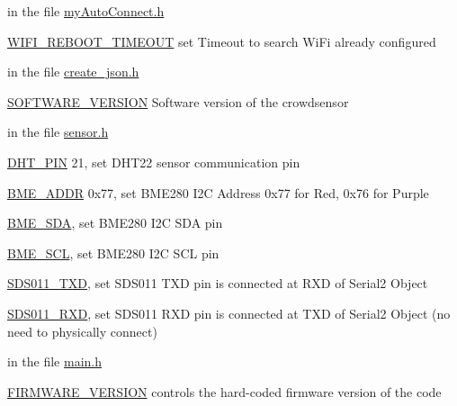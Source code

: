 \begin{DoxyItemize}
\item in the file \mbox{\hyperlink{my_auto_connect_8h}{my\+Auto\+Connect.\+h}}
\begin{DoxyItemize}
\item \mbox{\hyperlink{my_auto_connect_8h_ab8e5b92436ed19ff04454974ca9b5140}{W\+I\+F\+I\+\_\+\+R\+E\+B\+O\+O\+T\+\_\+\+T\+I\+M\+E\+O\+UT}} set Timeout to search Wi\+Fi already configured
\end{DoxyItemize}
\item in the file \mbox{\hyperlink{create__json_8h}{create\+\_\+json.\+h}}
\begin{DoxyItemize}
\item \mbox{\hyperlink{create__json_8h_ab1d2a71062488a1b8d2f9129682a42b9}{S\+O\+F\+T\+W\+A\+R\+E\+\_\+\+V\+E\+R\+S\+I\+ON}} Software version of the crowdsensor
\end{DoxyItemize}
\item in the file \mbox{\hyperlink{sensor_8h}{sensor.\+h}}
\begin{DoxyItemize}
\item \mbox{\hyperlink{sensor_8h_a661d236dd49f3aef3a2cf46cf6a1405e}{D\+H\+T\+\_\+\+P\+IN}} 21, set D\+H\+T22 sensor communication pin
\item \mbox{\hyperlink{sensor_8h_a9f6149e98e70e1d5be5f0f33921cb7d7}{B\+M\+E\+\_\+\+A\+D\+DR}} 0x77, set B\+M\+E280 I2C Address 0x77 for Red, 0x76 for Purple
\item \mbox{\hyperlink{sensor_8h_ad9e594e426bce833af06dea308dbbf9a}{B\+M\+E\+\_\+\+S\+DA}}, set B\+M\+E280 I2C S\+DA pin
\item \mbox{\hyperlink{sensor_8h_a5db75d8e5f3deda546603b949c520446}{B\+M\+E\+\_\+\+S\+CL}}, set B\+M\+E280 I2C S\+CL pin
\item \mbox{\hyperlink{sensor_8h_a7130f8006502cdaa31094baa3f4dd3fa}{S\+D\+S011\+\_\+\+T\+XD}}, set S\+D\+S011 T\+XD pin is connected at R\+XD of Serial2 Object
\item \mbox{\hyperlink{sensor_8h_ad2b404eb4de525cef31b8413f5d14b13}{S\+D\+S011\+\_\+\+R\+XD}}, set S\+D\+S011 R\+XD pin is connected at T\+XD of Serial2 Object (no need to physically connect)
\end{DoxyItemize}
\item in the file \mbox{\hyperlink{main_8h}{main.\+h}}
\begin{DoxyItemize}
\item \mbox{\hyperlink{main_8h_aa14dc39d52ab121ceb570f1a265385e0}{F\+I\+R\+M\+W\+A\+R\+E\+\_\+\+V\+E\+R\+S\+I\+ON}} controls the hard-\/coded firmware version of the code

\end{DoxyItemize}
\end{DoxyItemize}
